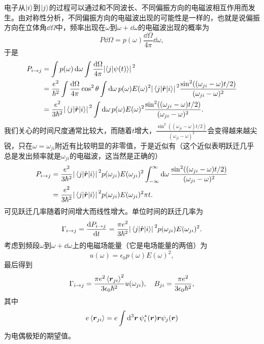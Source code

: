 \documentclass[UTF8, a4paper]{ctexart}
\begin{document}
电子从$\ket{i}$到$\ket{j}$的过程可以通过和不同波长、不同偏振方向的电磁波相互作用而发生。由对称性分析，不同偏振方向的电磁波出现的可能性是一样的，也就是说偏振方向在立体角$\dd{\Omega}$中，频率出现在$\omega$到$\omega+\dd{\omega}$的电磁波出现的概率为
\[
    P \dd{\Omega} = p(\omega) \frac{\dd{\Omega}}{4\pi} \dd{\omega},
\]
于是
\[
    \begin{aligned}
        P_{i \to j} &= \int p(\omega) \dd{\omega} \int \frac{\dd{\Omega}}{4\pi} \abs*{\braket{j}{\psi(t)}}^2 \\
        &= \frac{e^2}{\hbar^2} \int \frac{\dd{\Omega}}{4\pi} \cos^2 \theta \int \dd{\omega} p(\omega) E(\omega)^2 \abs*{\mel{j}{\hat{\vb*{r}}}{i}}^2 \frac{\sin^2((\omega_{ji} - \omega) t / 2)}{(\omega_{ji}-\omega)^2} \\
        &= \frac{e^2}{3 \hbar^2} \abs*{\mel{j}{\hat{\vb*{r}}}{i}}^2 \int \dd{\omega} p(\omega) E(\omega)^2 \frac{\sin^2((\omega_{ji} - \omega) t / 2)}{(\omega_{ji}-\omega)^2}.
    \end{aligned}
\]
我们关心的时间尺度通常比较大，而随着$t$增大，$\frac{\sin^2((\omega_{ji} - \omega) t / 2)}{(\omega_{ji}-\omega)^2}$会变得越来越尖锐，只在$\omega = \omega_{ji}$附近有比较明显的非零值，于是近似有（这个近似表明跃迁几乎总是发出频率就是$\omega_{ji}$的电磁波，这当然是正确的）
\[
    \begin{aligned}
        P_{i \to j} &= \frac{e^2}{3 \hbar^2} \abs*{\mel{j}{\hat{\vb*{r}}}{i}}^2 p(\omega_{ji}) E(\omega_{ji})^2 \int_{-\infty}^\infty \dd{\omega} \frac{\sin^2((\omega_{ji} - \omega) t / 2)}{(\omega_{ji}-\omega)^2} \\
        &= \frac{e^2}{3 \hbar^2} \abs*{\mel{j}{\hat{\vb*{r}}}{i}}^2 p(\omega_{ji}) E(\omega_{ji})^2 \pi t.
    \end{aligned}
\]
可见跃迁几率随着时间增大而线性增大。单位时间的跃迁几率为
\[
    \Gamma_{i \to j} = \dv{P_{i \to j}}{t} = \frac{\pi e^2}{3 \hbar^2} \abs*{\mel{j}{\hat{\vb*{r}}}{i}}^2 p(\omega_{ji}) E(\omega_{ji})^2.
\]
考虑到频段$\omega$到$\omega+\dd{\omega}$上的电磁场能量（它是电场能量的两倍）为
\begin{equation}
    u(\omega) = \epsilon_0 p(\omega) E(\omega)^2,
\end{equation}
最后得到
\begin{equation}
    \Gamma_{i \to j} = \frac{\pi e^2 \expval*{\vb*{r}_{ji}}^2}{3 \epsilon_0 \hbar^2} u(\omega_{ji}), \quad B_{ji} = \frac{\pi e^2}{3 \epsilon_0 \hbar^2},
\end{equation}
其中
\begin{equation}
    e \expval*{\vb*{r}_{ji}} = e \int \dd[3]{\vb*{r}} \psi_i^*(\vb*{r}) \vb*{r} \psi_j(\vb*{r})
    \label{eq:electro-dipole}
\end{equation}
为电偶极矩的期望值。
\end{document}
